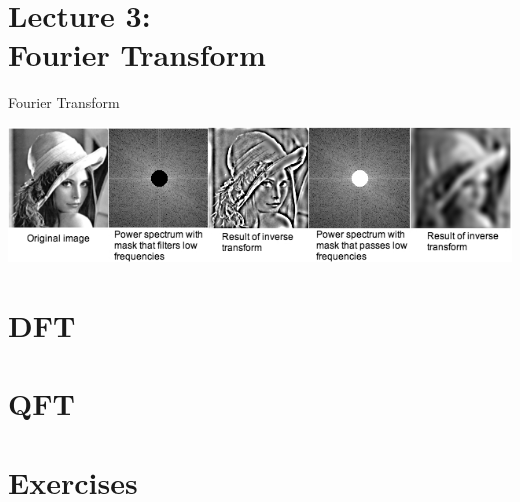 \section{Lecture 3: \\ Fourier Transform}
\SectionPage{}

\begin{frame}{Fourier Transform}
\begin{center}
    \includegraphics[width=\textwidth]{img/lec3/fft.jpg}
\end{center}
\end{frame}

\section{DFT}\SectionPage{}


\section{QFT}\SectionPage{}




\section{Exercises}\SectionPage{}

